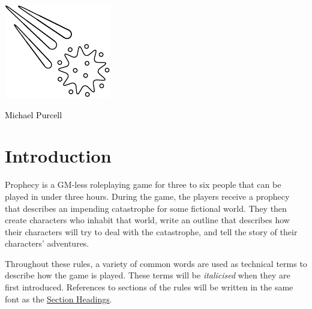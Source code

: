 \documentclass[12pt, a5paper, parskip=half-]{scrartcl}
\begin{document}

\begin{titlepage}
	\thispagestyle{titleheader}
		\enlargethispage{3.5\baselineskip} %

         \setmainfont{Cinzel Decorative}
	    \centering{
			{\fontsize{60}{72}\selectfont
			{\textcolor{black}{pROpHecY}}}
		}

		\setmainfont{URWClassico}
		\vspace{5mm}
		\centering{\Large{{\textcolor{black}{A tabletop roleplaying game \\ \smallskip about fate and destiny}}}}

		\vfill

		\includegraphics[scale=3.85]{Images/comet_diagram.pdf}

		\vfill
		
		\Large{{\textcolor{black}{Michael Purcell}}}\\
\end{titlepage}


\setmainfont{URWClassico}
\normalsize
\raggedright
\section*{Introduction} \label{section:introduction}
Prophecy is a GM-less roleplaying game for three to six people that can be played in under three hours.
During the game, the players receive a prophecy that describes an impending catastrophe for some fictional world.
They then create characters who inhabit that world, write an outline that describes how their characters will try to deal with the catastrophe, and tell the story of their characters' adventures.

Throughout these rules, a variety of common words are used as technical terms to describe how the game is played.
These terms will be \emph{italicised} when they are first introduced.
References to sections of the rules will be written in the same font as the \hyperref[section:introduction]{\cinzel \small Section Headings}.
\end{document}
